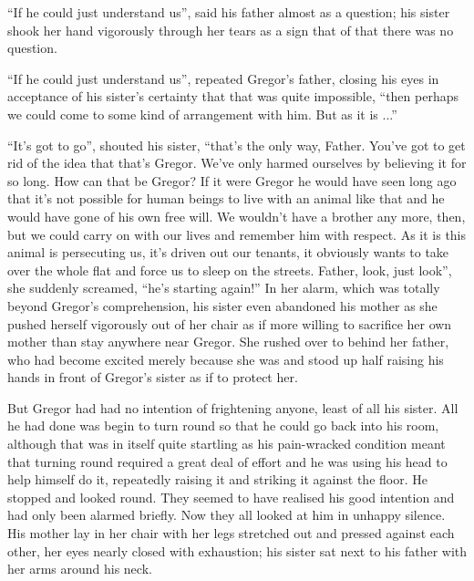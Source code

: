 “If he could just understand us”, said his father almost as a question;
his sister shook her hand vigorously through her tears as a sign that
of that there was no question.

“If he could just understand us”, repeated Gregor’s father, closing his
eyes in acceptance of his sister’s certainty that that was quite
impossible, “then perhaps we could come to some kind of arrangement
with him. But as it is ...”

“It’s got to go”, shouted his sister, “that’s the only way, Father.
You’ve got to get rid of the idea that that’s Gregor. We’ve only harmed
ourselves by believing it for so long. How can that be Gregor? If it
were Gregor he would have seen long ago that it’s not possible for
human beings to live with an animal like that and he would have gone of
his own free will. We wouldn’t have a brother any more, then, but we
could carry on with our lives and remember him with respect. As it is
this animal is persecuting us, it’s driven out our tenants, it
obviously wants to take over the whole flat and force us to sleep on
the streets. Father, look, just look”, she suddenly screamed, “he’s
starting again!” In her alarm, which was totally beyond Gregor’s
comprehension, his sister even abandoned his mother as she pushed
herself vigorously out of her chair as if more willing to sacrifice her
own mother than stay anywhere near Gregor. She rushed over to behind
her father, who had become excited merely because she was and stood up
half raising his hands in front of Gregor’s sister as if to protect
her.

But Gregor had had no intention of frightening anyone, least of all his
sister. All he had done was begin to turn round so that he could go
back into his room, although that was in itself quite startling as his
pain-wracked condition meant that turning round required a great deal
of effort and he was using his head to help himself do it, repeatedly
raising it and striking it against the floor. He stopped and looked
round. They seemed to have realised his good intention and had only
been alarmed briefly. Now they all looked at him in unhappy silence.
His mother lay in her chair with her legs stretched out and pressed
against each other, her eyes nearly closed with exhaustion; his sister
sat next to his father with her arms around his neck.

